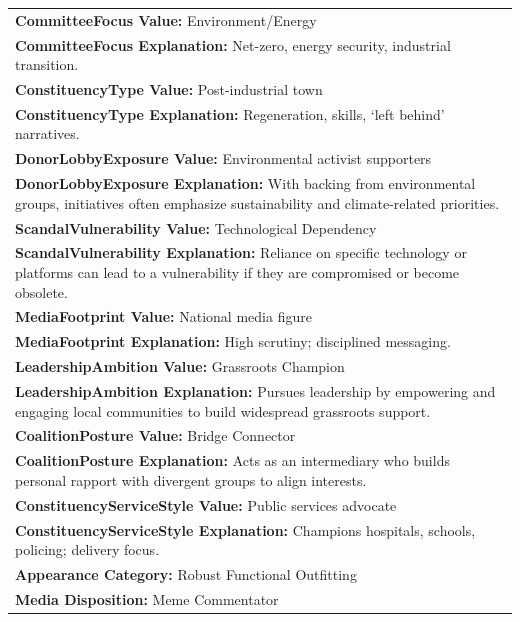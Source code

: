\documentclass[11pt]{article}
\begin{document}
\begin{table}[ht]
\begin{tabularx}{\textwidth}{X}
\textbf{CommitteeFocus Value:} Environment/Energy \\
\textbf{CommitteeFocus Explanation:} Net-zero, energy security, industrial transition. \\[4pt]

\textbf{ConstituencyType Value:} Post-industrial town \\
\textbf{ConstituencyType Explanation:} Regeneration, skills, ‘left behind’ narratives. \\[4pt]

\textbf{DonorLobbyExposure Value:} Environmental activist supporters \\
\textbf{DonorLobbyExposure Explanation:} With backing from environmental groups, initiatives often emphasize sustainability and climate-related priorities. \\[4pt]

\textbf{ScandalVulnerability Value:} Technological Dependency \\
\textbf{ScandalVulnerability Explanation:} Reliance on specific technology or platforms can lead to a vulnerability if they are compromised or become obsolete. \\[4pt]

\textbf{MediaFootprint Value:} National media figure \\
\textbf{MediaFootprint Explanation:} High scrutiny; disciplined messaging. \\[4pt]

\textbf{LeadershipAmbition Value:} Grassroots Champion \\
\textbf{LeadershipAmbition Explanation:} Pursues leadership by empowering and engaging local communities to build widespread grassroots support. \\[4pt]

\textbf{CoalitionPosture Value:} Bridge Connector \\
\textbf{CoalitionPosture Explanation:} Acts as an intermediary who builds personal rapport with divergent groups to align interests. \\[4pt]

\textbf{ConstituencyServiceStyle Value:} Public services advocate \\
\textbf{ConstituencyServiceStyle Explanation:} Champions hospitals, schools, policing; delivery focus. \\[4pt]

\textbf{Appearance Category:} Robust Functional Outfitting \\
\textbf{Media Disposition:} Meme Commentator \\[4pt]


\end{tabularx}
\end{table}
\end{document}
